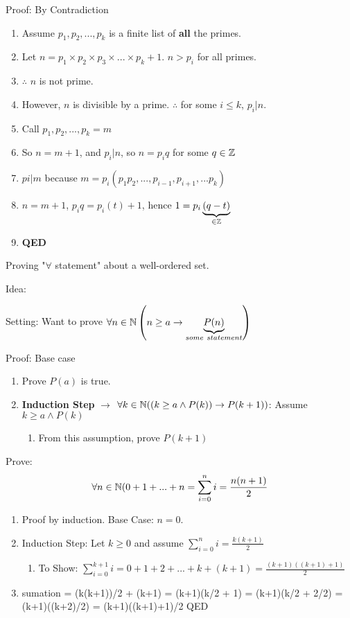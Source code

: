 Proof: By Contradiction
\begin{enumerate}
\item Assume $p_1,p_2,...,p_k$ is a finite list of \textbf{all} the primes.
\item Let $n=p_1\times p_2 \times p_3 \times ... \times p_k + 1$. $n>p_i$ for all primes.
\item $\therefore$ $n$ is not prime.
\item However, $n$ is divisible by a prime. $\therefore$ for some $i \le k$, $p_i|n$.
\item Call $p_1,p_2,...,p_k = m$
\item So $n = m + 1$, and $p_i|n$, so $n=p_iq$ for some $q\in \mathbb{Z}$
\item $pi|m$ because $m = p_i(p_1p_2,...,p_{i-1},p_{i+1},...p_k)$ %
\item $n = m + 1$, $p_iq = p_i(t) + 1$, hence $ 1 = p_i \underbrace{\left(q-t\right)}_{\in \mathbb{Z}} $ 

\item \textbf{QED}
\end{enumerate}


Proving "$\forall$ statement" about a well-ordered set.

Idea: %

Setting: Want to prove $\forall n \in \mathbb{N} \left( n \ge a \to \underbrace{P(n)}_{some\ statement} \right)$

Proof: Base case
\begin{enumerate}
\item Prove $P(a)$ is true.
\item \textbf{Induction Step} $\to$ $\forall k \in \mathbb{N} ((k\ge a \wedge P(k)) \to P(k+1))$: Assume $k \ge a \wedge P(k)$
	\begin{enumerate}
	\item From this assumption, prove $P(k+1)$
	\end{enumerate}
\end{enumerate}

Prove: \[ \forall n \in \mathbb{N} ( 0+1+...+n = \sum_{i=0}^n i = \frac{n(n+1)}{2} \]

\begin{enumerate}
\item Proof by induction. Base Case: $n = 0$.
\item Induction Step: Let $k \ge 0$ and assume $\displaystyle\sum_{i=0}^n i = \frac{k(k+1)}{2} $
	\begin{enumerate}
	\item To Show: $\displaystyle\sum_{i=0}^{k+1} i = 0 + 1 + 2 + ... + k + (k+1) = \frac{(k+1)((k+1)+1)}{2} $
	\end{enumerate}
\item sumation = (k(k+1))/2 + (k+1) = (k+1)(k/2 + 1) = (k+1)(k/2 + 2/2) = (k+1)((k+2)/2) = (k+1)((k+1)+1)/2 QED 
\end{enumerate}


